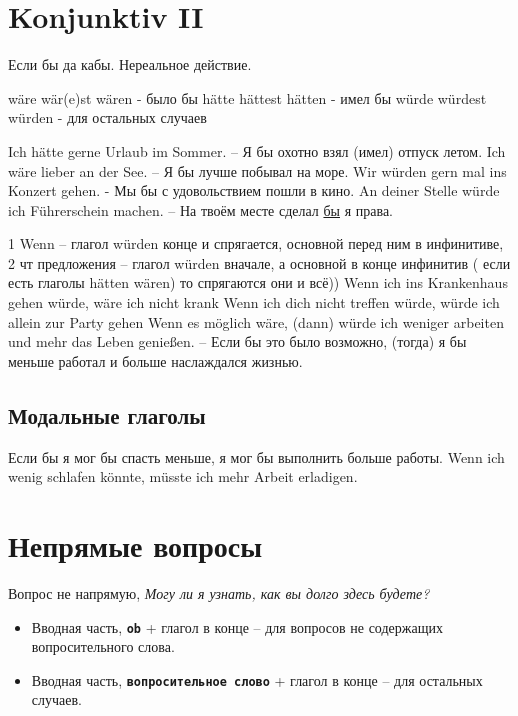 \documentclass[12pt,a4paper]{report}
\newcommand{\term}[1]{\texttt{\textbf{#1}}}
\newcommand{\satzew}[1]{\underline{#1}}
\newcommand{\ubersatze}[1]{\textit{#1}}
\begin{document}
\chapter{Konjunktiv II}
Если бы да кабы. Нереальное действие.

wäre wär(e)st wären - было бы
hätte hättest hätten - имел бы
würde würdest würden - для остальных случаев

Ich hätte gerne Urlaub im Sommer. – Я бы охотно взял (имел) отпуск летом.
Ich wäre lieber an der See. – Я бы лучше побывал на море.
Wir würden gern mal ins Konzert gehen. - Мы бы с удовольствием пошли в кино.
An deiner Stelle würde ich Führerschein machen. – На твоём месте сделал \satzew{бы} я права.

1 Wenn – глагол würden  конце и спрягается, основной перед ним в инфинитиве,  2 чт предложения – глагол würden вначале, а основной в конце инфинитив ( если есть глаголы hätten wären) то спрягаются они и всё))
Wenn ich ins Krankenhaus gehen würde,  wäre ich nicht krank 
Wenn ich dich nicht treffen würde, würde ich allein zur Party gehen
Wenn es möglich wäre, (dann) würde ich weniger arbeiten und mehr das Leben genießen. – Если бы это было возможно, (тогда) я бы меньше работал и больше наслаждался жизнью.

\section{Модальные глаголы}

Если бы я мог бы спасть меньше, я мог бы выполнить больше работы.
Wenn ich wenig schlafen könnte, müsste ich mehr Arbeit erladigen.


\chapter{Непрямые вопросы}
Вопрос не напрямую, \ubersatze{Могу ли я узнать, как вы долго здесь будете?}

\begin{itemize}
 \item Вводная часть, \term{ob} + глагол в конце -- для вопросов не содержащих вопросительного слова.
 \item Вводная часть, \term{вопросительное слово} + глагол в конце -- для остальных случаев.
\end{itemize}
\end{document}
